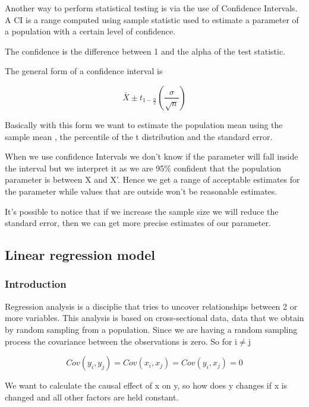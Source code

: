 Another way to perform statistical testing is via the use of Confidence Intervals. A CI is a range computed using sample statistic used to estimate a parameter of a population with a certain level of confidence.

The confidence is the difference between 1 and the alpha of the test statistic.


The general form of a confidence interval is 

\[
\bar{X} \pm t_{1-\frac{\alpha}{2}} (\frac{\hat{\sigma}}{\sqrt{n}})
\]

Basically with this form we want to estimate the population mean using the sample mean
, the percentile of the t distribution and the standard error.

\vspace{10pt}

When we use confidence Intervals we don't know if the parameter will fall inside the interval but we interpret it
as we are 95\% confident that the population parameter is between X and X'. Hence we get a range of acceptable estimates for the parameter while 
values that are outside won't be reasonable estimates. 

\vspace{10pt}

It's possible to notice that if we increase the sample size we will reduce the standard error, then we can get more precise estimates of our parameter. 


\subsection{Linear regression model}

\subsubsection{Introduction}

Regression analysis is a disciplie that tries to uncover relationships between 2 or more variables.
This analysis is based on cross-sectional data, data that we obtain by random sampling from a population. Since we 
are having a random sampling process the covariance between the observations is zero. So for i$\ne$j

\[
Cov(y_i,y_j) = Cov(x_i, x_j) = Cov(y_i, x_j) = 0
\]

We want to calculate the causal effect of x on y, so how does y changes if x is changed and all other factors are held constant.

